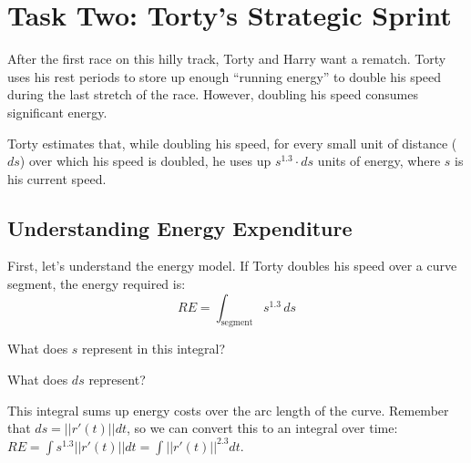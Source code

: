 \documentclass{ximera}
\begin{document}
\section*{Task Two: Torty's Strategic Sprint}

After the first race on this hilly track, Torty and Harry want a rematch. Torty uses his rest periods to store up enough ``running energy'' to double his speed during the last stretch of the race. However, doubling his speed consumes significant energy.

Torty estimates that, while doubling his speed, for every small unit of distance ($ds$) over which his speed is doubled, he uses up $s^{1.3}\cdot ds$ units of energy, where $s$ is his current speed.

\subsection*{Understanding Energy Expenditure}

\begin{problem}
    First, let's understand the energy model. If Torty doubles his speed over a curve segment, the energy required is:
    \[RE=\int_{\text{segment}} s^{1.3}\, ds\]
    
    What does $s$ represent in this integral?
    \begin{multipleChoice}
    \end{multipleChoice}
    
    What does $ds$ represent?
    \begin{multipleChoice}
    \end{multipleChoice}
    
    \begin{feedback}
        This integral sums up energy costs over the arc length of the curve. Remember that $ds=||r'(t)||dt$, so we can convert this to an integral over time: $RE=\int s^{1.3}||r'(t)||dt=\int ||r'(t)||^{2.3}dt$.
    \end{feedback}
\end{problem}
\end{document}
